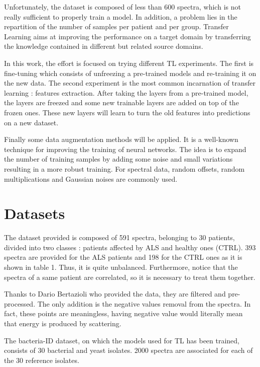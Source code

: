 Unfortunately, the dataset is composed of less than 600 spectra, which is not really sufficient to properly train a model. In addition, a problem lies in the repartition of the number of samples per patient and per group. Transfer Learning aims at improving the performance on a target domain by transferring the knowledge contained in different but related source domains.

In this work, the effort is focused on trying different TL experiments. The first is fine-tuning which consists of unfreezing a pre-trained models and re-training it on the new data. The second experiment is the most common incarnation of transfer learning : features extraction. After taking the layers from a pre-trained model, the layers are freezed and some new trainable layers are added on top of the frozen ones. These new layers will learn to turn the old features into predictions on a new dataset.

Finally some data augmentation methods will be applied. It is a well-known technique for improving the training of neural networks. The idea is to expand the number of training samples by adding some noise and small variations resulting in a more robust training. For spectral data, random offsets, random multiplications and Gaussian noises are commonly used.

\section{Datasets}
The dataset provided is composed of 591 spectra, belonging to 30 patients, divided into two classes : patients affected by ALS and healthy ones (CTRL). 393 spectra are provided for the ALS patients and 198 for the CTRL ones as it is shown in table 1. Thus, it is quite unbalanced. Furthermore, notice that the spectra of a same patient are correlated, so it is necessary to treat them together.

Thanks to Dario Bertazioli who provided the data, they are filtered and pre-processed. The only addition is the negative values removal from the spectra. In fact, these points are meaningless, having negative value would literally mean that energy is produced by scattering.

The bacteria-ID dataset, on which the models used for TL has been trained, consists of 30 bacterial and yeast isolates. 2000 spectra are associated for each of the 30 reference isolates. 


